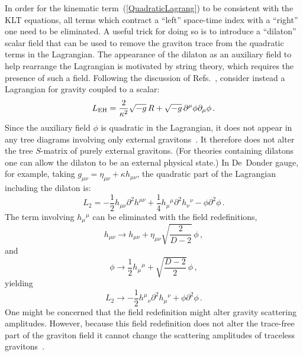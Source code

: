 \documentclass[12pt]{livrev}
\begin{document}
In order for the kinematic term~(\ref{QuadraticLagrang}) to be
consistent with the KLT equations, all terms which contract a ``left''
space-time index with a ``right'' one need to be eliminated.  A useful
trick for doing so is to introduce a ``dilaton'' scalar field that can be used to
remove the graviton trace from the quadratic terms in the Lagrangian.
The appearance of the dilaton as an auxiliary field to help rearrange
the Lagrangian is motivated by string theory, which requires the
presence of such a field.  Following the discussion of
Refs.~\cite{BDS,BernGrant}, consider instead a Lagrangian for gravity
coupled to a scalar:
%
\begin{equation}
L_{\rm EH} =   {2\over \kappa^2} \sqrt{-g} \, 
       R +  \sqrt{-g} \, \partial^\mu\phi\partial_\mu\phi \,.
\end{equation}
%
Since the auxiliary field $\phi$ is quadratic in the Lagrangian, it
does not appear in any tree diagrams involving only external
gravitons~\cite{BernGrant}.  It therefore does not alter the tree
$S$-matrix of purely external gravitons.  (For theories containing
dilatons one can allow the dilaton to be an external physical
state.)  In De~Donder gauge, for example, taking $g_{\mu\nu} =
\eta_{\mu\nu} + \kappa h_{\mu\nu}$, the quadratic part of the
Lagrangian including the dilaton is:
%
\begin{equation}
L_2 = - \frac{1}{2} h_{\mu\nu} \partial^2 h^{\mu\nu} 
+ \frac{1}{4} h_{\mu}{}^{\mu} \partial^2 h_{\nu}{}^{\nu}
-  \phi \partial^2 \phi \,.
\end{equation}
%
The term involving $h_{\mu}{}^{\mu}$ can be eliminated with the
field redefinitions,
%
\begin{equation}
 h_{\mu\nu} \rightarrow h_{\mu\nu} 
        + \eta_{\mu\nu}{\sqrt{\frac{2}{D-2}}}\, \phi\,,
\end{equation}
and
%
\begin{equation}
 \phi \rightarrow \frac{1}{2} h_{\mu}{}^{\mu} + \sqrt{\frac{D-2}{2}}\, \phi\,,
\label{FieldRedefA}
\end{equation}
%
yielding
%
\begin{equation}
L_2 \rightarrow 
- \frac{1}{2} h^{\mu}{}_{\nu} \partial^2 h_{\mu}{}^{\nu} 
+  \phi \partial^2 \phi\,.
\end{equation}
%
One might be concerned that the field redefinition might alter gravity
scattering amplitudes.  However, because this field redefinition does
not alter the trace-free part of the graviton field it cannot change
the scattering amplitudes of traceless
gravitons~\cite{BernGrant}. 
\end{document}
